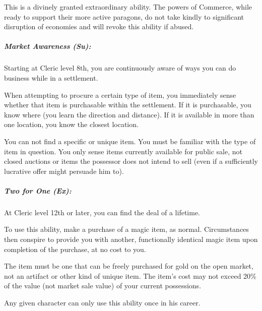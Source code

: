 This is a divinely granted extraordinary ability. The powers of Commerce, while ready to support their more active paragons, do not take kindly to significant disruption of economies and will revoke this ability if abused.
\subparagraph{Market Awareness (Su):}
Starting at Cleric level 8th, you are continuously aware of ways you can do business while in a settlement.

When attempting to procure a certain type of item, you immediately sense whether that item is purchasable within the settlement.
If it is purchasable, you know where (you learn the direction and distance). If it is available in more than one location, you know the closest location.

You can not find a specific or unique item. You must be familiar with the type of item in question. You only sense items currently available for public sale, not closed auctions or items the possessor does not intend to sell (even if a sufficiently lucrative offer might persuade him to).
\subparagraph{Two for One (Ex):}
At Cleric level 12th or later, you can find the deal of a lifetime.

To use this ability, make a purchase of a magic item, as normal. Circumstances then conspire to provide you with another, functionally identical magic item upon completion of the purchase, at no cost to you.

The item must be one that can be freely purchased for gold on the open market, not an artifact or other kind of unique item. The item's cost may not exceed 20\% of the value (not market sale value) of your current possessions.

Any given character can only use this ability once in his career.
